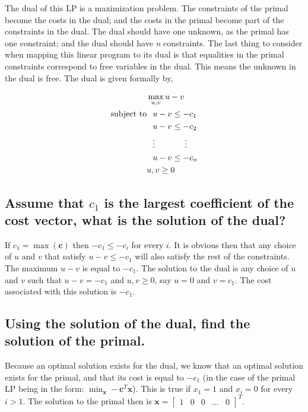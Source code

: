 \documentclass{article}
\begin{document}
The dual of this LP is a maximization problem.
The constraints of the primal become the costs in the dual; and the costs in the primal become part of the constraints in the dual.
The dual should have one unknown, as the primal has one constraint; and the dual should have \textit{n} constraints.
The last thing to consider when mapping this linear program to its dual is that equalities in the primal constraints correspond to free variables in the dual.
This means the unknown in the dual is free.
The dual is given formally by,

\begin{align*}
&\max_{u, v} u - v \\
\text{subject to} & \hspace{0.1in} u - v \le -c_1\\
& \hspace{0.1in} u - v \le -c_2\\
& \hspace{0.1in} \vdots \hspace{0.5in} \vdots\\
& \hspace{0.1in} u - v \le -c_n\\ 
&u, v \ge 0
\end{align*}

\subsection{Assume that $c_1$ is the largest coefficient of the cost vector, what is the solution of the dual?}

If $c_1 = \max(\mathbf{c})$ then $-c_1 \le -c_i$ for every $i$.
It is obvious then that any choice of $u$ and $v$ that satisfy $u - v \le -c_1$ will also satisfy the rest of the constraints.
The maximum $u - v$ is equal to $-c_1$.
The solution to the dual is any choice of $u$ and $v$ such that $u - v = -c_1$ and $u, v \ge 0$, say $u = 0$ and $v = c_1$.
The cost associated with this solution is $-c_1$.

\subsection{Using the solution of the dual, find the solution of the primal.}

Because an optimal solution exists for the dual, we know that an optimal solution exists for the primal, and that its cost is equal to $-c_1$ (in the case of the primal LP being in the form: $\min_\mathbf{x} -\mathbf{c}^T \mathbf{x}$). This is true if $x_1 = 1$ and $x_i = 0$ for every $i > 1$. The solution to the primal then is $\mathbf{x} = \begin{bmatrix}1 & 0 & 0 & \dots & 0\end{bmatrix}^T$.
\end{document}
